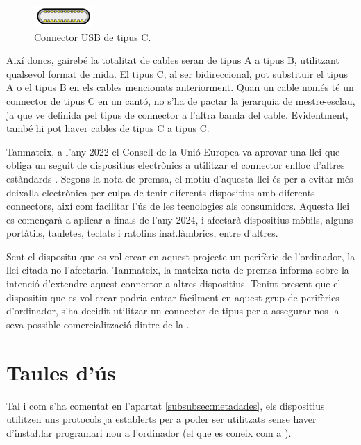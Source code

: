 \begin{figure}[ht]
    \centering
    \includegraphics[width=0.2\textwidth]{images/usb_c.png}
    \caption{Connector USB de tipus C. \cite{Contributors2024USB}}
    \label{fig:usb_connectors_c}
\end{figure}

Així doncs, gairebé la totalitat de cables  seran de tipus A a tipus
B, utilitzant qualsevol format de mida. El tipus C, al ser bidireccional, pot
substituir el tipus A o el tipus B en els cables mencionats anteriorment.
Quan un cable només té un connector de tipus C en un cantó, no s'ha de pactar
la jerarquia de mestre-esclau, ja que ve definida pel tipus de connector a
l'altra banda del cable. Evidentment, també hi pot haver cables de tipus C a
tipus C.

Tanmateix, a l'any 2022 el Consell de la Unió Europea va aprovar una llei
que obliga un seguit de dispositius electrònics a utilitzar el connector
 enlloc d'altres estàndards \cite{Council2022Common}. Segons la
nota de premsa, el motiu d'aquesta llei és per a evitar més deixalla electrònica
per culpa de tenir diferents dispositius amb diferents connectors, així com
facilitar l'ús de les tecnologies als consumidors. Aquesta llei
es començarà a aplicar a finals de l'any 2024, i afectarà dispositius mòbils, 
alguns portàtils, tauletes, teclats i ratolins ina\l.làmbrics, entre
d'altres.

Sent el dispositu que es vol crear en aquest projecte un perifèric de
l'ordinador, la llei citada no l'afectaria. Tanmateix, la mateixa nota de premsa
informa sobre la intenció d'extendre aquest connector a altres dispositius.
Tenint present que el dispositiu que es vol crear podria entrar fàcilment en
aquest grup de perifèrics d'ordinador, s'ha decidit utilitzar un connector de
tipus  per a assegurar-nos la seva possible comercialització dintre
de la .

\section{Taules d'ús }
\label{sec:hut}

Tal i com s'ha comentat en l'apartat \ref{subsubsec:metadades}, els dispositius
 utilitzen uns protocols ja establerts per a poder ser utilitzats
sense haver d'insta\l.lar programari nou a l'ordinador (el que es coneix com
a ).

